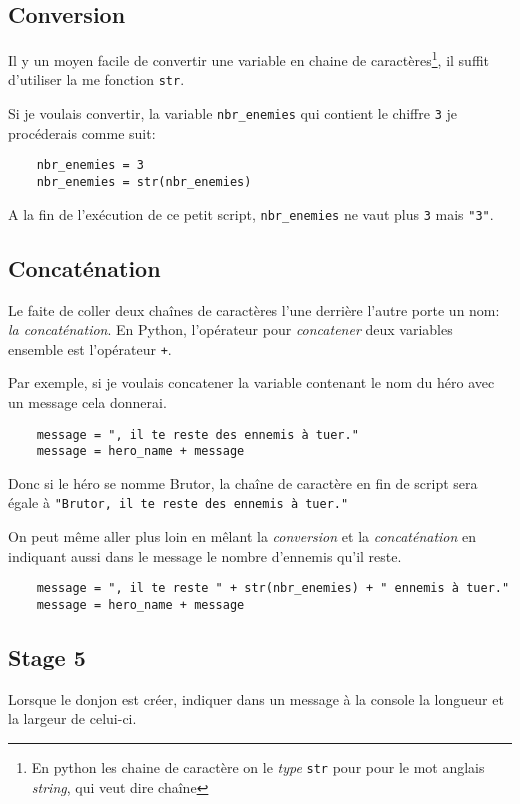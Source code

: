 \documentclass[12pt,a4paper]{report}
\newcommand{\codeintext}[1]{\texttt{#1}}
\begin{document}
\subsection{Conversion}
Il y un moyen facile de convertir une variable en chaine de caractères\footnote{En python les chaine de caractère on le \emph{type} \codeintext{str} pour pour le mot anglais \textit{string}, qui veut dire chaîne}, il suffit d'utiliser la me fonction \codeintext{str}.

Si je voulais convertir, la variable \codeintext{nbr\_enemies} qui contient le chiffre \codeintext{3} je procéderais comme suit:

\begin{lstlisting}
	nbr_enemies = 3
	nbr_enemies = str(nbr_enemies)
\end{lstlisting}

A la fin de l'exécution de ce petit script, \codeintext{nbr\_enemies} ne vaut plus \codeintext{3} mais \codeintext{"3"}.

\subsection{Concaténation}
Le faite de coller deux chaînes de caractères l'une derrière l'autre porte un nom: \emph{la concaténation}.
En Python, l'opérateur pour \emph{concatener} deux variables ensemble est l'opérateur \codeintext{+}.

Par exemple, si je voulais concatener la variable contenant le nom du héro avec un message cela donnerai.
 
\begin{lstlisting}
	message = ", il te reste des ennemis à tuer."
	message = hero_name + message
\end{lstlisting}

Donc si le héro se nomme Brutor, la chaîne de caractère en fin de script sera égale à \codeintext{"Brutor, il te reste des ennemis à tuer."}

On peut même aller plus loin en mêlant la \emph{conversion} et la \emph{concaténation} en indiquant aussi dans le message le nombre d'ennemis qu'il reste.

\begin{lstlisting}
	message = ", il te reste " + str(nbr_enemies) + " ennemis à tuer."
	message = hero_name + message
\end{lstlisting}

\subsection{Stage 5}
Lorsque le donjon est créer, indiquer dans un message à la console la longueur et la largeur de celui-ci.
\end{document}
